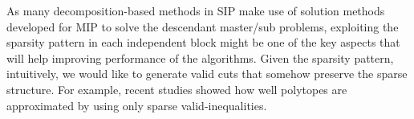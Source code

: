As many decomposition-based methods in SIP make use of solution methods developed for MIP to solve the descendant master/sub problems, exploiting the sparsity pattern in each independent block might be one of the key aspects that will help improving performance of the algorithms. Given the sparsity pattern, intuitively, we would like to generate valid cuts that somehow preserve the sparse structure. For example, recent studies \cite{journal:DMW2015,journal:DIM2015} showed how well polytopes are approximated by using only sparse valid-inequalities.











